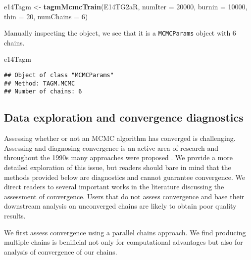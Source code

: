 \documentclass[9pt,a4paper,]{extarticle}
\newenvironment{Shaded}{\begin{snugshade}}{\end{snugshade}}
\newcommand{\DataTypeTok}[1]{\textcolor[rgb]{0.13,0.29,0.53}{#1}}
\newcommand{\DecValTok}[1]{\textcolor[rgb]{0.00,0.00,0.81}{#1}}
\newcommand{\KeywordTok}[1]{\textcolor[rgb]{0.13,0.29,0.53}{\textbf{#1}}}
\newcommand{\NormalTok}[1]{#1}
\newcommand{\StringTok}[1]{\textcolor[rgb]{0.31,0.60,0.02}{#1}}
\begin{document}
\begin{Shaded}
\begin{Highlighting}[]
\NormalTok{e14Tagm <-}\StringTok{ }\KeywordTok{tagmMcmcTrain}\NormalTok{(E14TG2aR,}
                         \DataTypeTok{numIter =} \DecValTok{20000}\NormalTok{,}
                         \DataTypeTok{burnin =} \DecValTok{10000}\NormalTok{,}
                         \DataTypeTok{thin =} \DecValTok{20}\NormalTok{,}
                         \DataTypeTok{numChains =} \DecValTok{6}\NormalTok{)}
\end{Highlighting}
\end{Shaded}

Manually inspecting the object, we see that it is a \texttt{MCMCParams}
object with 6 chains.

\begin{Shaded}
\begin{Highlighting}[]
\NormalTok{e14Tagm}
\end{Highlighting}
\end{Shaded}

\begin{verbatim}
## Object of class "MCMCParams"
## Method: TAGM.MCMC 
## Number of chains: 6
\end{verbatim}

\hypertarget{data-exploration-and-convergence-diagnostics}{%
\subsection{Data exploration and convergence diagnostics}\label{data-exploration-and-convergence-diagnostics}}

Assessing whether or not an MCMC algorithm has converged is
challenging. Assessing and diagnosing convergence is an active area of
research and throughout the 1990s many approaches were proposed
\citep{Geweke:1992, Gelman:1992, Roberts:1994, Brooks:1998}. We provide a
more detailed exploration of this issue, but readers should bare in
mind that the methods provided below are diagnostics and cannot
guarantee convergence. We direct readers to several important works in
the literature discussing the assessment of convergence. Users that do
not assess convergence and base their downstream analysis on
unconverged chains are likely to obtain poor quality results.

We first assess convergence using a parallel chains approach. We find
producing multiple chains is benificial not only for computational
advantages but also for analysis of convergence of our chains.
\end{document}
